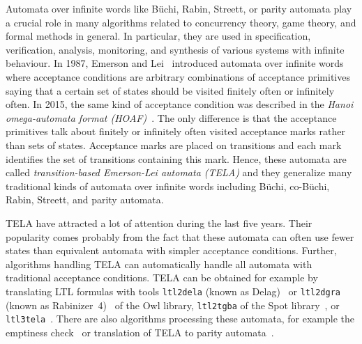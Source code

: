 \documentclass[a4paper,UKenglish,cleveref,autoref,thm-restate]{lipics-v2021}
\begin{document}

Automata over infinite words like Büchi, Rabin, Streett, or parity
automata play a crucial role in many algorithms related to 
concurrency theory, game theory, and formal methods in general. In
particular, they are used in specification, verification, analysis,
monitoring, and synthesis of various systems with infinite
behaviour. In 1987, Emerson and Lei~\cite{emerson.87.scp} introduced
automata over infinite words where acceptance conditions are arbitrary
combinations of acceptance primitives saying that a certain set of
states should be visited finitely often or infinitely often. In 2015,
the same kind of acceptance condition was described in the \emph{Hanoi
  omega-automata format (HOAF)}~\cite{babiak.15.cav}. The only
difference is that the acceptance primitives talk about finitely or
infinitely often visited acceptance marks rather than sets of states.
Acceptance marks are placed on transitions and each mark identifies
the set of transitions containing this mark. Hence, these automata are
called \emph{transition-based Emerson-Lei automata (TELA)} and they
generalize many traditional kinds of automata over infinite words
including Büchi, co-Büchi, Rabin, Streett, and parity automata.

TELA have attracted a lot of attention during the last five years.
Their popularity comes probably from the fact that these automata can
often use fewer states than equivalent automata with simpler
acceptance conditions. Further, algorithms handling TELA can
automatically handle all automata with traditional acceptance
conditions. TELA can be obtained for example by translating LTL
formulas with tools \texttt{ltl2dela} (known as
Delag)~\cite{muller.17.gandalf} or \texttt{ltl2dgra} (known as
Rabinizer~4)~\cite{kretinsky.18.cav} of the Owl library,
\texttt{ltl2tgba} of the Spot library~\cite{duret.16.atva2}, or
\texttt{ltl3tela}~\cite{major.19.atva}. There are also algorithms
processing these automata, for example the emptiness
check~\cite{baier.19.atva} or translation of TELA to parity
automata~\cite{renkin.20.atva,casares.22.tacas}.
\end{document}
